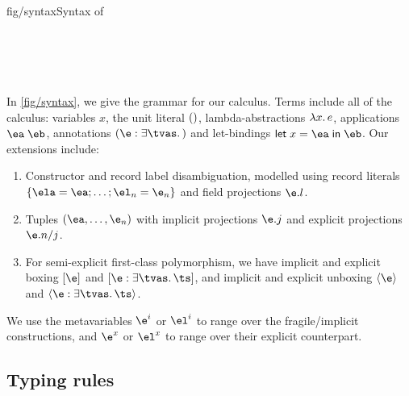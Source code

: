 \documentclass[acmsmall,screen,nonacm,review]{acmart}
\begin{document}
\begin{bnffig}{fig/syntax}{Syntax of \OML}
\\
\\[1ex]
\entry[Types]{\t}{
   \tv \and
   1 \and
   \tya \to \tyb \and
   \T \tys \and
   \Pi \iton \ti \and
   \tpoly \ts
}\\
\\
\\
\end{bnffig}


In \cref {fig/syntax}, we give the grammar for our calculus. Terms include
all of the \ML calculus: variables $x$, the unit literal $()$,
lambda-abstractions $\lambda x. \, e$, applications $\eapp \eone \etwo$,
annotations $\eannot \e \tvs \t$ and let-bindings $\elet x \eone \etwo$.
Our extensions include:
\begin{enumerate}
\item
  Constructor and record label disambiguation, modelled using record
  literals $\erecord { \ela = \eone; \ldots; \el_n = \en }$ and field
  projections $\efield \e l$.

\item
  Tuples $(\eone, \ldots, \en)$ with implicit projections
  $\efield \e j$ and explicit projections $\exfield \e j n$.

\item
  For semi-explicit first-class polymorphism, we have implicit and explicit boxing $\epoly \e$ and $\expoly \e \tvs \ts$, and implicit and explicit unboxing $\einst \e$ and $\exinst \e \tvs \ts$.

\end{enumerate}
We use the metavariables $\e^i$ or $\el^i$ to range over the fragile/implicit constructions, and $\e^x$ or $\el^x$ to range over their explicit counterpart.

\subsection{Typing rules}
\label{sec/language/typing-rules}
\end{document}
